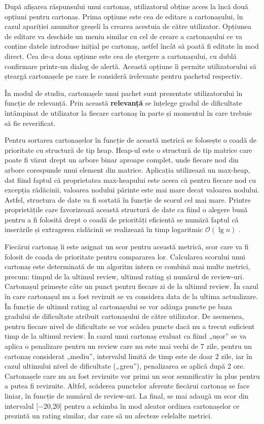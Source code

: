 După afișarea răspunsului unui cartonaș, utilizatorul obține acces la încă două opțiuni pentru cartonaș. Prima opțiune este cea de editare a cartonașului, în cazul apariției anumitor greșeli la crearea acestuia de către utilizator. Opțiunea de editare va deschide un meniu similar cu cel de creare a cartonașului ce va conține datele introduse inițial pe cartonaș, astfel încât să poată fi editate în mod direct. Cea de-a doua opțiune este cea de ștergere a cartonașului, cu dublă confirmare printr-un dialog de alertă. Această opțiune îi permite utilizatorului să șteargă cartonașele pe care le consideră irelevante pentru pachetul respectiv.

În modul de studiu, cartonașele unui pachet sunt prezentate utilizatorului în funcție de relevanță. Prin această \textbf{relevanță} se înțelege gradul de dificultate întâmpinat de utilizator la fiecare cartonaș în parte și momentul în care trebuie să fie reverificat.

Pentru sortarea cartonașelor în funcție de această metrică se folosește o coadă de prioritate cu structură de tip heap. Heap-ul este o structură de tip matrice care poate fi văzut drept un arbore binar aproape complet, unde fiecare nod din arbore corespunde unui element din matrice. Aplicația utilizează un max-heap, dat fiind faptul că proprietatea max-heapului este aceea că pentru fiecare nod cu excepția rădăcinii, valoarea nodului părinte este mai mare decat valoarea nodului. Astfel, structura de date va fi sortată în funcție de scorul cel mai mare. Printre proprietățile care favorizează această structură de date ca fiind o alegere bună pentru a fi folosită drept o coadă de priorități eficientă se numără faptul că inserările și extragerea rădăcinii se realizează în timp logaritmic $\mathcal{O}(\lg n)$ \cite{introductionAlgorithms}.

Fiecărui cartonaș îi este asignat un scor pentru această metrică, scor care va fi folosit de coada de prioritate pentru compararea lor. Calcularea scorului unui cartonaș este determinată de un algoritm intern ce combină mai multe metrici, precum: timpul de la ultimul review, ultimul rating și numărul de review-uri. Cartonașul primește câte un punct pentru fiecare zi de la ultimul review. În cazul în care cartonașul nu a fost revizuit se va considera data de la ultima actualizare. În funcție de ultimul rating al cartonașului se vor adăuga puncte pe baza gradului de dificultate atribuit cartonașului de către utilizator. De asemenea, pentru fiecare nivel de dificultate se vor scădea puncte dacă nu a trecut suficient timp de la ultimul review. În cazul unui cartonaș evaluat ca fiind „ușor” se va aplica o penalizare pentru un review care nu este mai vechi de 7 zile, pentru un cartonaș considerat „mediu”, intervalul limită de timp este de doar 2 zile, iar în cazul ultimului nivel de dificultate („greu”), penalizarea se aplică după 2 ore. Cartonașele care nu au fost revizuite vor primi un scor semnificativ în plus pentru a putea fi revizuite. Altfel, scăderea punctelor aferente fiecărui cartonaș se face liniar, în funcție de numărul de review-uri. La final, se mai adaugă un scor din intervalul [−20,20] pentru a schimba în mod aleator ordinea cartonașelor ce prezintă un rating similar, dar care să nu afecteze celelalte metrici.


